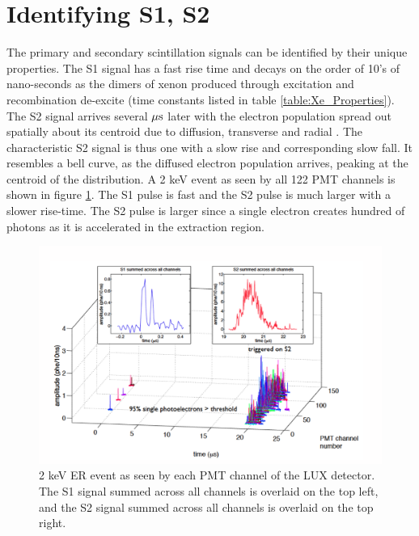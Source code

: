 \section{Identifying S1, S2}
The primary and secondary scintillation signals can be identified by their unique properties. The S1 signal has a fast rise time and decays on the order of 10's of nano-seconds as the dimers of xenon produced through excitation and recombination de-excite (time constants listed in table \ref{table:Xe_Properties}). The S2 signal arrives several $\rm \mu s$ later with the electron population spread out spatially about its centroid due to diffusion, transverse and radial \cite{Electron_Diffusion}. The characteristic S2 signal is thus one with a slow rise and corresponding slow fall. It resembles a bell curve, as the diffused electron population arrives, peaking at the centroid of the distribution. A 2 keV event as seen by all 122 PMT channels is shown in figure \ref{fig:LUX_Golden}. The S1 pulse is fast and the S2 pulse is much larger with a slower rise-time.  The S2 pulse is larger since a single electron creates hundred of photons as it is accelerated in the extraction region. 


 \begin{figure}[h!]\centering
\includegraphics[width=130mm]{Chapter_LUX_Det/LUX_Golden_Event_2keV.png}
\caption{ 2 keV ER event as seen by each PMT channel of the LUX detector. The S1 signal summed across all channels is overlaid on the top left, and the S2 signal summed across all channels is overlaid on the top right.}
\label{fig:LUX_Golden}
\end{figure}

